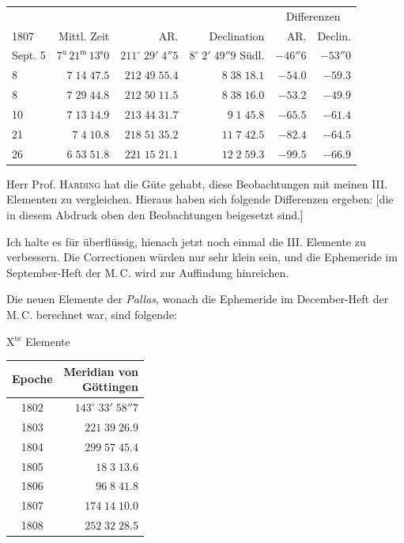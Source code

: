 \begin{center}\fontsize{9}{11}\selectfont\setlength{\tabcolsep}{2pt}\renewcommand{\arraystretch}{1.15}\begin{tabular}{lrrrrr}
& & & & \multicolumn{2}{c}{Differenzen}\\
1807 & Mittl. Zeit & AR. & Declination & AR. & Declin.\\\hline
Sept. 5 & $7^{\text{u}}\,21^{\text{m}}\,13^{\text{s}}0$ & $211^\circ\;29'\;4''5$ & $8^\circ\;2'\;49''9$ Südl. & $-46''6$ & $-53''0$\\
8 & $7\;14\;47.5$ & $212\;49\;55.4$ & $8\;38\;18.1$ & $-54.0$ & $-59.3$\\
8 & $7\;29\;44.8$ & $212\;50\;11.5$ & $8\;38\;16.0$ & $-53.2$ & $-49.9$\\
10 & $7\;13\;14.9$ & $213\;44\;31.7$ & $9\;1\;45.8$ & $-65.5$ & $-61.4$\\
21 & $7\;4\;10.8$ & $218\;51\;35.2$ & $11\;7\;42.5$ & $-82.4$ & $-64.5$\\
26 & $6\;53\;51.8$ & $221\;15\;21.1$ & $12\;2\;59.3$ & $-99.5$ & $-66.9$\\
\end{tabular}\end{center}

\par\indent Herr Prof. \textsc{Harding} hat die Güte gehabt, diese Beobachtungen mit meinen III. Elementen zu
vergleichen. Hieraus haben sich folgende Differenzen ergeben: [die in diesem Abdruck oben
den Beobachtungen beigesetzt sind.]

\par\indent Ich halte es für überflüssig, hienach jetzt noch einmal die III. Elemente zu verbessern. Die
Correctionen würden nur sehr klein sein, und die Ephemeride im September-Heft der M.\,C. wird zur
Auffindung hinreichen.

\par\indent Die neuen Elemente der \emph{Pallas}, wonach die Ephemeride im December-Heft der M.\,C. berechnet
war, sind folgende:

\begin{center}
X$^{\text{te}}$ Elemente
\end{center}


\begin{center}\fontsize{10}{12}\selectfont\setlength{\tabcolsep}{2pt}\renewcommand{\arraystretch}{1.15}\begin{tabular}{cr}
Epoche & \shortstack{Meridian von\\Göttingen}\\\hline
1802 & $143^\circ\;33'\;58''7$\\
1803 & $221\;39\;26.9$\\
1804 & $299\;57\;45.4$\\
1805 & $18\;3\;13.6$\\
1806 & $96\;8\;41.8$\\
1807 & $174\;14\;10.0$\\
1808 & $252\;32\;28.5$\\
\end{tabular}\end{center}

